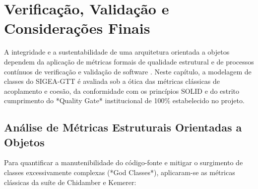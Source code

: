 \chapter{Verificação, Validação e Considerações Finais}
\label{cap_verificacao_validacao}

A integridade e a sustentabilidade de uma arquitetura orientada a objetos dependem da aplicação de métricas formais de qualidade estrutural e de processos contínuos de verificação e validação de software \cite{pressman2021, sommerville2019}. Neste capítulo, a modelagem de classes do SIGEA-GTT é avaliada sob a ótica das métricas clássicas de acoplamento e coesão, da conformidade com os princípios SOLID e do estrito cumprimento do *Quality Gate* institucional de 100\% estabelecido no projeto.

\section{Análise de Métricas Estruturais Orientadas a Objetos}
\label{sec_metricas_oo}

Para quantificar a manutenibilidade do código-fonte e mitigar o surgimento de classes excessivamente complexas (*God Classes*), aplicaram-se as métricas clássicas da suíte de Chidamber e Kemerer:

